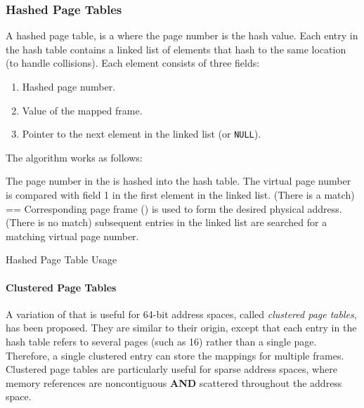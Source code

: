 \subsubsection{Hashed Page Tables}\label{subsubsec:Hashed_Page_Tables}
A hashed page table, is a  where the page number is the hash value.
Each entry in the hash table contains a linked list of elements that hash to the same location (to handle collisions).
Each element consists of three fields:
\begin{enumerate}[noitemsep]
\item Hashed page number.
\item Value of the mapped frame.
\item Pointer to the next element in the linked list (or \texttt{NULL}).
\end{enumerate}

The algorithm works as follows:
\begin{algorithm}[H]
  \DontPrintSemicolon{}
  \BlankLine{}

  The page number in the  is hashed into the hash table. \;
  The virtual page number is compared
  with field 1 in the first element in the linked list.
  \If(There is a match){\fieldOne{} == \fieldTwo{}}{
    Corresponding page frame (\fieldTwo{}) is used to form the desired physical address.
  }\Else(There is no match){
    subsequent entries in the linked list are searched for a matching virtual page number.
  }

  \caption{Hashed Page Table Usage}
  \label{algo:Hashed_Page_Table_Usage}
\end{algorithm}

\paragraph{Clustered Page Tables}\label{par:Clustered_Page_Tables}
A variation of  that is useful for 64-bit address spaces, called \emph{clustered page tables}, has been proposed.
They are similar to their origin, except that each entry in the hash table refers to several pages (such as 16) rather than a single page.
Therefore, a single clustered  entry can store the mappings for multiple frames.
Clustered page tables are particularly useful for sparse address spaces, where memory references are noncontiguous \textbf{AND} scattered throughout the address space.

